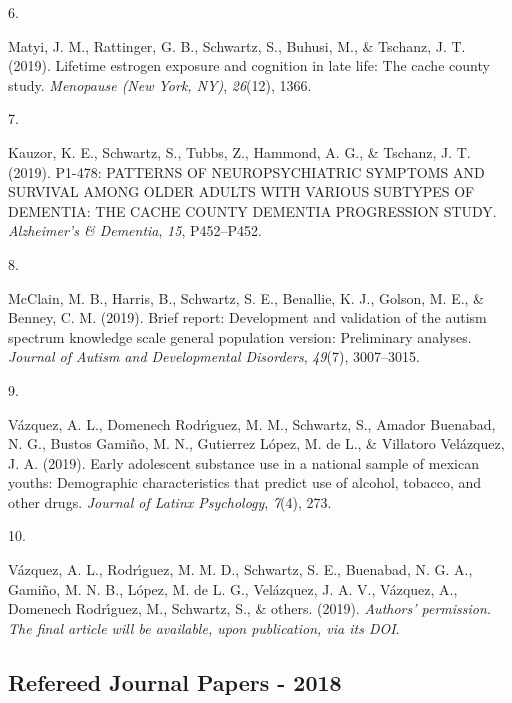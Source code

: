 \documentclass[11pt,a4paper,]{moderncv}
\newlength{\csllabelwidth}
\newcommand{\CSLLeftMargin}[1]{\parbox[t]{\csllabelwidth}{#1}}
\newcommand{\CSLRightInline}[1]{\parbox[t]{\linewidth - \csllabelwidth}{#1}}
\begin{document}
\leavevmode\hypertarget{ref-matyi2019lifetime}{}%
\CSLLeftMargin{6. }
\CSLRightInline{Matyi, J. M., Rattinger, G. B., Schwartz, S., Buhusi,
M., \& Tschanz, J. T. (2019). Lifetime estrogen exposure and cognition
in late life: The cache county study. \emph{Menopause (New York, NY)},
\emph{26}(12), 1366.}

\leavevmode\hypertarget{ref-kauzor2019p1}{}%
\CSLLeftMargin{7. }
\CSLRightInline{Kauzor, K. E., Schwartz, S., Tubbs, Z., Hammond, A. G.,
\& Tschanz, J. T. (2019). P1-478: PATTERNS OF NEUROPSYCHIATRIC SYMPTOMS
AND SURVIVAL AMONG OLDER ADULTS WITH VARIOUS SUBTYPES OF DEMENTIA: THE
CACHE COUNTY DEMENTIA PROGRESSION STUDY. \emph{Alzheimer's \& Dementia},
\emph{15}, P452--P452.}

\leavevmode\hypertarget{ref-mcclain2019brief}{}%
\CSLLeftMargin{8. }
\CSLRightInline{McClain, M. B., Harris, B., Schwartz, S. E., Benallie,
K. J., Golson, M. E., \& Benney, C. M. (2019). Brief report: Development
and validation of the autism spectrum knowledge scale general population
version: Preliminary analyses. \emph{Journal of Autism and Developmental
Disorders}, \emph{49}(7), 3007--3015.}

\leavevmode\hypertarget{ref-vazquez2019early}{}%
\CSLLeftMargin{9. }
\CSLRightInline{Vázquez, A. L., Domenech Rodrı́guez, M. M., Schwartz, S.,
Amador Buenabad, N. G., Bustos Gamiño, M. N., Gutierrez López, M. de L.,
\& Villatoro Velázquez, J. A. (2019). Early adolescent substance use in
a national sample of mexican youths: Demographic characteristics that
predict use of alcohol, tobacco, and other drugs. \emph{Journal of
Latinx Psychology}, \emph{7}(4), 273.}

\leavevmode\hypertarget{ref-vazquez2019authors}{}%
\CSLLeftMargin{10. }
\CSLRightInline{Vázquez, A. L., Rodrı́guez, M. M. D., Schwartz, S. E.,
Buenabad, N. G. A., Gamiño, M. N. B., López, M. de L. G., Velázquez, J.
A. V., Vázquez, A., Domenech Rodrı́guez, M., Schwartz, S., \& others.
(2019). \emph{Authors' permission. The final article will be available,
upon publication, via its DOI}.}

\vspace{7mm}

\hypertarget{refereed-journal-papers---2018}{%
\subsection{\texorpdfstring{\textbf{Refereed Journal Papers -
2018}}{Refereed Journal Papers - 2018}}\label{refereed-journal-papers---2018}}
\end{document}
